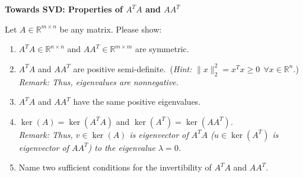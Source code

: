 \textbf{Towards SVD: Properties of $A^TA$ and $AA^T$}

Let $A \in  \mathbb{R}^{m \times n}$ be any matrix. Please show:
\begin{enumerate}
	\item $A^TA \in \mathbb{R}^{n \times n}$ and $AA^T \in \mathbb{R}^{m \times m}$ are  symmetric.
	\item $A^TA$ and $AA^T$ are positive semi-definite.~(\textit{Hint:} $\|x\|_2^2 = x^Tx \geq 0 ~~\forall x \in \mathbb{R}^n$.)\\
	\textit{Remark: Thus, eigenvalues are nonnegative.}
	\item $A^TA$ and $AA^T$ have the same positive eigenvalues.
	\item $\ker(A) = \ker(A^TA)$ and $\ker(A^T) = \ker(AA^T)$.\\
	\textit{Remark: Thus, $v \in \ker(A)$ is eigenvector of $A^TA$ ($u \in \ker(A^T)$ is eigenvector of $AA^T$) to the eigenvalue $\lambda = 0$.}
	\item Name two sufficient conditions for the invertibility of $A^TA$ and $AA^T$.
\end{enumerate}
